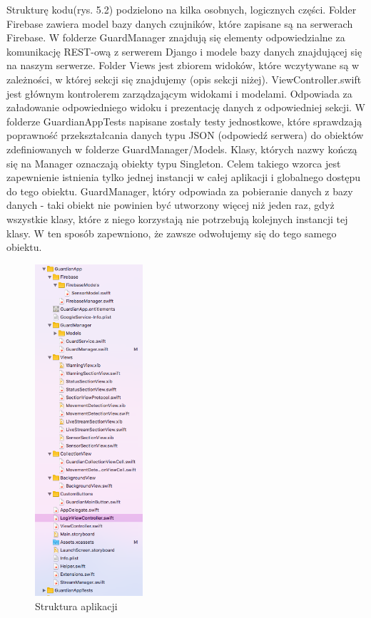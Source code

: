 Strukturę kodu(rys. 5.2) podzielono na kilka osobnych, logicznych części. Folder Firebase zawiera model bazy danych czujników, które zapisane są na serwerach Firebase. W folderze GuardManager znajdują się elementy odpowiedzialne za komunikację REST-ową z serwerem Django i modele bazy danych znajdującej się na naszym serwerze. Folder Views jest zbiorem widoków, które wczytywane są w zależności, w której sekcji się znajdujemy (opis sekcji niżej). ViewController.swift jest głównym kontrolerem zarządzającym widokami i modelami. Odpowiada za załadowanie odpowiedniego widoku i prezentację danych z odpowiedniej sekcji. W folderze GuardianAppTests napisane zostały testy jednostkowe, które sprawdzają poprawność przekształcania danych typu JSON (odpowiedź serwera) do obiektów zdefiniowanych w folderze GuardManager/Models. Klasy, których nazwy kończą się na Manager oznaczają obiekty typu Singleton. Celem takiego wzorca jest zapewnienie istnienia tylko jednej instancji w całej aplikacji i globalnego dostępu do tego obiektu. GuardManager, który odpowiada za pobieranie danych z bazy danych - taki obiekt nie powinien być utworzony więcej niż jeden raz, gdyż wszystkie klasy, które z niego korzystają nie potrzebują kolejnych instancji tej klasy. W ten sposób zapewniono, że zawsze odwołujemy się do tego samego obiektu.
\begin{figure}[h]
	\centering
	\includegraphics[width=4cm]{iOSstructure}
	\caption{Struktura aplikacji}
\end{figure}
